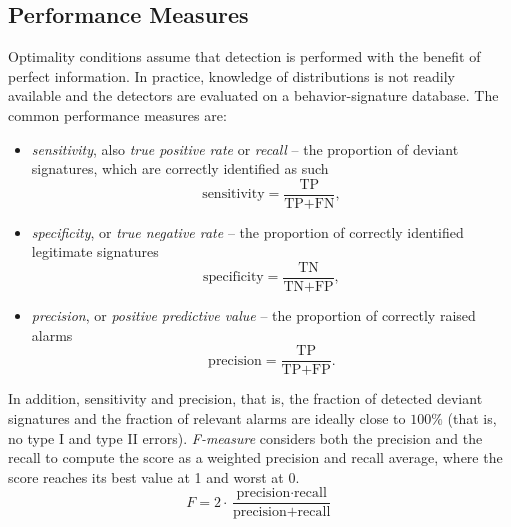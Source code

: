\subsection{Performance Measures}
Optimality conditions assume that detection is performed with the benefit of perfect information. In practice, knowledge of distributions is not readily available and the detectors are evaluated on a behavior-signature database. 
The common performance measures are:
\begin{itemize}
	\item \emph{sensitivity}, also \emph{true positive rate} or \emph{recall} -- the proportion of deviant signatures, which are correctly identified as such
		\begin{equation}
				\text{sensitivity} = \frac{\text{TP}}{\text{TP}+\text{FN}},%
		\label{eq:sensitivity}
		\end{equation}
	\item \emph{specificity}, or \emph{true negative rate} -- the proportion of correctly identified legitimate signatures
		\begin{equation}
				\text{specificity} = \frac{\text{TN}}{\text{TN}+\text{FP}},%
		\label{eq:specificity}
		\end{equation}
	\item \emph{precision}, or \emph{positive predictive value} -- the proportion of correctly raised alarms
		\begin{equation}
				\text{precision} = \frac{\text{TP}}{\text{TP}+\text{FP}}.
		\label{eq:precision}
		\end{equation}
\end{itemize}
In addition, sensitivity and precision, that is, the fraction of detected deviant signatures and the fraction of relevant alarms are ideally close to $100\%$ (that is, no type I and type II errors). \emph{F-measure} considers both the precision and the recall to compute the score as a weighted precision and recall average, where the score reaches its best value at 1 and worst at 0. 
\begin{equation}
	F = 2 \cdot \frac{\text{precision} \cdot \text{recall}}{\text{precision} + \text{recall}}
\label{eq:F-measure}
\end{equation}



